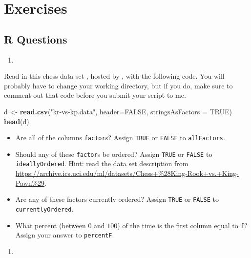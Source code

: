 \documentclass[12pt,krantz2]{krantz}
\makeatletter
\newenvironment{Shaded}{\begin{snugshade}}{\end{snugshade}}
\newcommand{\DataTypeTok}[1]{\textcolor[rgb]{0.27,0.27,0.27}{#1}}
\newcommand{\KeywordTok}[1]{\textcolor[rgb]{0.27,0.27,0.27}{\textbf{#1}}}
\newcommand{\NormalTok}[1]{#1}
\newcommand{\OtherTok}[1]{\textcolor[rgb]{0.37,0.37,0.37}{#1}}
\newcommand{\StringTok}[1]{\textcolor[rgb]{0.5,0.5,0.5}{#1}}
\providecommand{\tightlist}{%
  \setlength{\itemsep}{0pt}\setlength{\parskip}{0pt}}
\newenvironment{kframe}{%
\medskip{}
\setlength{\fboxsep}{.8em}
 \def\at@end@of@kframe{}%
 \ifinner\ifhmode%
  \def\at@end@of@kframe{\end{minipage}}%
  \begin{minipage}{\columnwidth}%
 \fi\fi%
 \def\FrameCommand##1{\hskip\@totalleftmargin \hskip-\fboxsep
 \colorbox{shadecolor}{##1}\hskip-\fboxsep
     \hskip-\linewidth \hskip-\@totalleftmargin \hskip\columnwidth}%
 \MakeFramed {\advance\hsize-\width
   \@totalleftmargin\z@ \linewidth\hsize
   \@setminipage}}%
 {\par\unskip\endMakeFramed%
 \at@end@of@kframe}
\renewenvironment{Shaded}{\begin{kframe}}{\end{kframe}}
\makeatother
\begin{document}
\hypertarget{exercises-5}{%
\section{Exercises}\label{exercises-5}}

\hypertarget{r-questions-5}{%
\subsection{R Questions}\label{r-questions-5}}

\begin{enumerate}
\def\labelenumi{\arabic{enumi}.}
\item
\end{enumerate}

Read in this chess data set \citep{misc_chess}, hosted by \citep{uci_data}, with the following code. You will probably have to change your working directory, but if you do, make sure to comment out that code before you submit your script to me.

\begin{Shaded}
\begin{Highlighting}[]
\NormalTok{d <-}\StringTok{ }\KeywordTok{read.csv}\NormalTok{(}\StringTok{"kr-vs-kp.data"}\NormalTok{, }\DataTypeTok{header=}\OtherTok{FALSE}\NormalTok{, }\DataTypeTok{stringsAsFactors =} \OtherTok{TRUE}\NormalTok{)}
\KeywordTok{head}\NormalTok{(d)}
\end{Highlighting}
\end{Shaded}

\begin{itemize}
\tightlist
\item
  Are all of the columns \texttt{factor}s? Assign \texttt{TRUE} or \texttt{FALSE} to \texttt{allFactors}.
\item
  Should any of these \texttt{factor}s be ordered? Assign \texttt{TRUE} or \texttt{FALSE} to \texttt{ideallyOrdered}. Hint: read the data set description from \url{https://archive.ics.uci.edu/ml/datasets/Chess+\%28King-Rook+vs.+King-Pawn\%29}.
\item
  Are any of these factors currently ordered? Assign \texttt{TRUE} or \texttt{FALSE} to \texttt{currentlyOrdered}.
\item
  What percent (between \(0\) and \(100\)) of the time is the first column equal to \texttt{\textquotesingle{}f\textquotesingle{}}? Assign your answer to \texttt{percentF}.
\end{itemize}

\begin{enumerate}
\def\labelenumi{\arabic{enumi}.}
\setcounter{enumi}{1}
\item
\end{enumerate}
\end{document}
